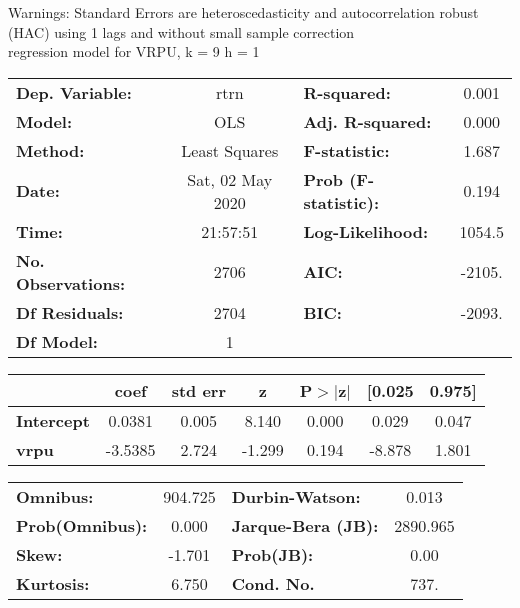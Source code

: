 Warnings: \newline
 [1] Standard Errors are heteroscedasticity and autocorrelation robust (HAC) using 1 lags and without small sample correction\\ 

regression model for VRPU, k = 9 h = 1\begin{center}
\begin{tabular}{lclc}
\toprule
\textbf{Dep. Variable:}    &       rtrn       & \textbf{  R-squared:         } &     0.001   \\
\textbf{Model:}            &       OLS        & \textbf{  Adj. R-squared:    } &     0.000   \\
\textbf{Method:}           &  Least Squares   & \textbf{  F-statistic:       } &     1.687   \\
\textbf{Date:}             & Sat, 02 May 2020 & \textbf{  Prob (F-statistic):} &    0.194    \\
\textbf{Time:}             &     21:57:51     & \textbf{  Log-Likelihood:    } &    1054.5   \\
\textbf{No. Observations:} &        2706      & \textbf{  AIC:               } &    -2105.   \\
\textbf{Df Residuals:}     &        2704      & \textbf{  BIC:               } &    -2093.   \\
\textbf{Df Model:}         &           1      & \textbf{                     } &             \\
\bottomrule
\end{tabular}
\begin{tabular}{lcccccc}
                   & \textbf{coef} & \textbf{std err} & \textbf{z} & \textbf{P$> |$z$|$} & \textbf{[0.025} & \textbf{0.975]}  \\
\midrule
\textbf{Intercept} &       0.0381  &        0.005     &     8.140  &         0.000        &        0.029    &        0.047     \\
\textbf{vrpu}      &      -3.5385  &        2.724     &    -1.299  &         0.194        &       -8.878    &        1.801     \\
\bottomrule
\end{tabular}
\begin{tabular}{lclc}
\textbf{Omnibus:}       & 904.725 & \textbf{  Durbin-Watson:     } &    0.013  \\
\textbf{Prob(Omnibus):} &   0.000 & \textbf{  Jarque-Bera (JB):  } & 2890.965  \\
\textbf{Skew:}          &  -1.701 & \textbf{  Prob(JB):          } &     0.00  \\
\textbf{Kurtosis:}      &   6.750 & \textbf{  Cond. No.          } &     737.  \\
\bottomrule
\end{tabular}
\end{center}

